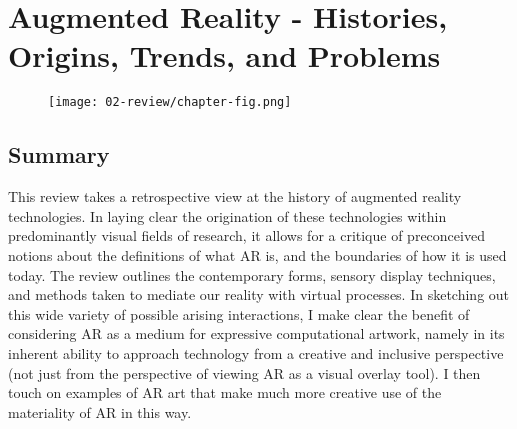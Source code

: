 \chapter{Augmented Reality - Histories, Origins, Trends, and Problems}
\label{sec: review}
\epigraph{\emph{}}{}

\begin{figure}
    \centering
    \texttt{[image: 02-review/chapter-fig.png]}
    \captionsetup{labelformat=empty}
    \caption[\autoref{sec: review}: We AR in MoMA (from \citeauthor{veenhof2010}, \citeyear{veenhof2010}), Microsoft Hololens 2 in use by the U.S. Army (from \citeauthor{microsoft2021}, \citeyear{microsoft2021}), Project North Star (own photograph)]{}
\end{figure}

\clearpage
\section{Summary}\label{sec: review-summary}
This review takes a retrospective view at the history of augmented reality technologies. In laying clear the origination of these technologies within predominantly visual fields of research, it allows for a critique of preconceived notions about the definitions of what AR is, and the boundaries of how it is used today. The review outlines the contemporary forms, sensory display techniques, and methods taken to mediate our reality with virtual processes. In sketching out this wide variety of possible arising interactions, I make clear the benefit of considering AR as a medium for expressive computational artwork, namely in its inherent ability to approach technology from a creative and inclusive perspective (not just from the perspective of viewing AR as a visual overlay tool). I then touch on examples of AR art that make much more creative use of the materiality of AR in this way.



